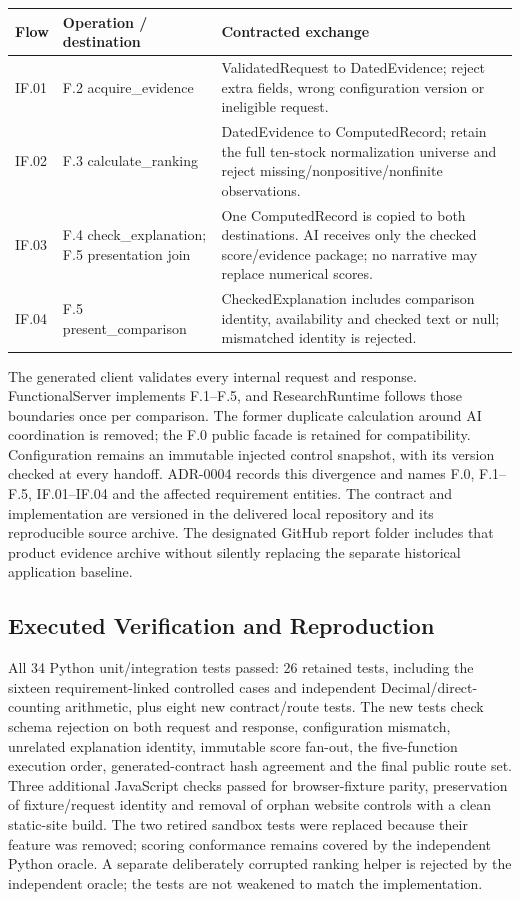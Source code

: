 \documentclass[11pt,letterpaper]{article}
\begin{document}
\begin{tabularx}{\linewidth}{@{}p{.15\linewidth}p{.28\linewidth}X@{}}\toprule
Flow & Operation / destination & Contracted exchange\\\midrule
IF.01 & F.2 acquire\_evidence & ValidatedRequest to DatedEvidence; reject extra fields, wrong configuration version or ineligible request.\\
IF.02 & F.3 calculate\_ranking & DatedEvidence to ComputedRecord; retain the full ten-stock normalization universe and reject missing/nonpositive/nonfinite observations.\\
IF.03 & F.4 check\_explanation; F.5 presentation join & One ComputedRecord is copied to both destinations. AI receives only the checked score/evidence package; no narrative may replace numerical scores.\\
IF.04 & F.5 present\_comparison & CheckedExplanation includes comparison identity, availability and checked text or null; mismatched identity is rejected.\\\bottomrule\end{tabularx}

The generated client validates every internal request and response. FunctionalServer implements F.1--F.5, and ResearchRuntime follows those boundaries once per comparison. The former duplicate calculation around AI coordination is removed; the F.0 public facade is retained for compatibility. Configuration remains an immutable injected control snapshot, with its version checked at every handoff. ADR-0004 records this divergence and names F.0, F.1--F.5, IF.01--IF.04 and the affected requirement entities. The contract and implementation are versioned in the delivered local repository and its reproducible source archive. The designated GitHub report folder includes that product evidence archive without silently replacing the separate historical application baseline.

\subsection{Executed Verification and Reproduction}
All 34 Python unit/integration tests passed: 26 retained tests, including the sixteen requirement-linked controlled cases and independent Decimal/direct-counting arithmetic, plus eight new contract/route tests. The new tests check schema rejection on both request and response, configuration mismatch, unrelated explanation identity, immutable score fan-out, the five-function execution order, generated-contract hash agreement and the final public route set. Three additional JavaScript checks passed for browser-fixture parity, preservation of fixture/request identity and removal of orphan website controls with a clean static-site build. The two retired sandbox tests were replaced because their feature was removed; scoring conformance remains covered by the independent Python oracle. A separate deliberately corrupted ranking helper is rejected by the independent oracle; the tests are not weakened to match the implementation.
\end{document}
